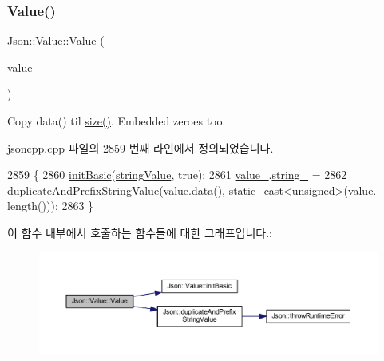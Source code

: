 \subsubsection{\texorpdfstring{Value()}{Value()}\hspace{0.1cm}{\footnotesize\ttfamily [10/12]}}
{\footnotesize\ttfamily Json\+::\+Value\+::\+Value (\begin{DoxyParamCaption}\item[{const \hyperlink{json_8h_a1e723f95759de062585bc4a8fd3fa4be}{J\+S\+O\+N\+C\+P\+P\+\_\+\+S\+T\+R\+I\+NG} \&}]{value }\end{DoxyParamCaption})}



Copy data() til \hyperlink{class_json_1_1_value_a0ec2808e1d7efa4e9fad938d6667be44}{size()}. Embedded zeroes too. 



jsoncpp.\+cpp 파일의 2859 번째 라인에서 정의되었습니다.


\begin{DoxyCode}
2859                                         \{
2860   \hyperlink{class_json_1_1_value_a32b86b71564157f40f880f5736be822a}{initBasic}(\hyperlink{namespace_json_a7d654b75c16a57007925868e38212b4ea804ef857affea2d415843c73f261c258}{stringValue}, \textcolor{keyword}{true});
2861   \hyperlink{class_json_1_1_value_aef578244546212705b9f81eb84d7e151}{value\_}.\hyperlink{union_json_1_1_value_1_1_value_holder_a70ac2b153bc405527baa3850d2ddc3cb}{string\_} =
2862       \hyperlink{namespace_json_a9795a09a0141d1f12d307c4386aeaee6}{duplicateAndPrefixStringValue}(value.data(), \textcolor{keyword}{static\_cast<}\textcolor{keywordtype}{unsigned}\textcolor{keyword}{>}(value.
      length()));
2863 \}
\end{DoxyCode}
이 함수 내부에서 호출하는 함수들에 대한 그래프입니다.\+:\nopagebreak
\begin{figure}[H]
\begin{center}
\leavevmode
\includegraphics[width=350pt]{class_json_1_1_value_a89ef37969ff7c6eb3a7afcca03d4cd4a_cgraph}
\end{center}
\end{figure}
\mbox{\label{class_json_1_1_value_a350a31ea4a30d384994b0bc010b17495}} 
